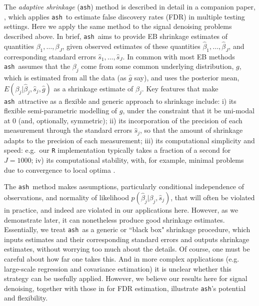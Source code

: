 \documentclass[12pt]{article}
\begin{document}
\def\ash{{\tt ash}}
\def\bhat{\hat{\beta}}
\def\shat{\hat{s}}

The {\it adaptive shrinkage} (\ash) method is described in detail in a companion paper, \cite{stephens:2015}, which applies \ash~to estimate false discovery rates (FDR) in multiple testing settings. Here we apply the same method to the signal denoising problems described above.  In brief, \ash~aims to provide EB shrinkage estimates of quantities $\beta_1,\dots,\beta_J$, given observed estimates of these quantities $\bhat_1,\dots,\bhat_J$, and corresponding standard errors $\shat_1,\dots,\shat_J$. In common with most EB methods \ash~assumes that the $\beta_j$ come from some common underlying distribution, $g$, which is estimated from all the data (as $\hat{g}$ say), and uses the posterior mean,  $E(\beta_j | \bhat_j, \shat_j, \hat{g})$ as a shrinkage estimate of $\beta_j$. Key features that make \ash~attractive as a flexible and generic approach to shrinkage include: i) its flexible semi-parametric modelling of $g$, under the constraint that it be uni-modal at 0 (and, optionally, symmetric); ii) its incorporation of the precision of each measurement through the standard errors $\shat_j$, so that the amount of shrinkage adapts to the precision of each measurement;  iii) its computational simplicity and speed: e.g.~our {\tt R} implementation typically takes a fraction of a second for $J=1000$; iv) its computational stability, with, for example, minimal problems due to convergence to local optima \cite{stephens:2015}. 





The \ash~method makes assumptions, particularly conditional independence of observations, and normality of likelihood $p(\bhat_j | \beta_j, \shat_j)$, that will often be violated in practice,
and indeed are violated in our applications here. However, as we demonstrate later, it can nonetheless produce good shrinkage estimates. 
Essentially, we treat
\ash~as a generic or ``black box" shrinkage procedure, which inputs
estimates and their corresponding standard errors and outputs shrinkage estimates, without worrying too much about 
the details. Of course, one must be careful about how far one takes this.  And in more complex applications 
(e.g. large-scale regression and covariance estimation) it is unclear whether this strategy can be usefully applied. However,
we believe our results here for signal denoising, together with those in \cite{stephens:15} for FDR estimation, illustrate \ash's potential and flexibility. 
\end{document}
